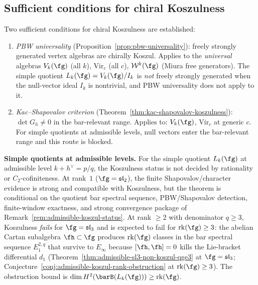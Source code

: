 \subsection{Sufficient conditions for chiral Koszulness}
\label{subsec:concordance-koszulness-sufficient}

Two sufficient conditions for chiral Koszulness are established:
\begin{enumerate}[label=\textup{(\alph*)}]
\item \emph{PBW universality}
 (Proposition~\ref{prop:pbw-universality}):
 freely strongly generated vertex algebras are chirally Koszul.
 Applies to the \emph{universal} algebras $V_k(\fg)$ (all $k$),
 $\mathrm{Vir}_c$ (all $c$), $\mathcal{W}^k(\fg)$ (Miura free
 generators). The simple quotient $L_k(\fg) = V_k(\fg)/I_k$
 is \emph{not} freely strongly generated when the null-vector ideal
 $I_k$ is nontrivial, and PBW universality does not apply to it.
\item \emph{Kac--Shapovalov criterion}
 (Theorem~\ref{thm:kac-shapovalov-koszulness}):
 $\det G_h \neq 0$ in the bar-relevant range.
 Applies to: $V_k(\fg)$, $\mathrm{Vir}_c$ at generic $c$.
 For simple quotients at admissible levels, null vectors enter the
 bar-relevant range and this route is blocked.
\end{enumerate}

\noindent\textbf{Simple quotients at admissible levels.}
For the simple quotient $L_k(\fg)$ at admissible level
$k + h^\vee = p/q$, the Koszulness status is not decided by
rationality or $C_2$-cofiniteness. At rank~$1$
($\fg = \mathfrak{sl}_2$), the finite Shapovalov/character evidence is
strong and compatible with Koszulness, but the theorem is conditional
on the quotient bar spectral sequence, PBW/Shapovalov detection,
finite-window exactness, and strong convergence package of
Remark~\ref{rem:admissible-koszul-status}.
At rank $\geq 2$ with denominator $q \geq 3$, Koszulness
\emph{fails} for $\fg = \mathfrak{sl}_3$ and is expected to fail
for $\mathrm{rk}(\fg) \geq 3$: the abelian Cartan subalgebra
$\fh \subset \fg$ produces $\mathrm{rk}(\fg)$ classes in the bar
spectral sequence $E_1^{2,q}$ that survive to $E_\infty$ because
$[\fh, \fh] = 0$ kills the Lie-bracket differential $d_1$
(Theorem~\ref{thm:admissible-sl3-non-koszul-qge3} at
$\fg = \mathfrak{sl}_3$;
Conjecture~\ref{conj:admissible-koszul-rank-obstruction} at
$\mathrm{rk}(\fg) \geq 3$).
The obstruction bound is
$\dim H^2(\barB(L_k(\fg))) \geq \mathrm{rk}(\fg)$.

